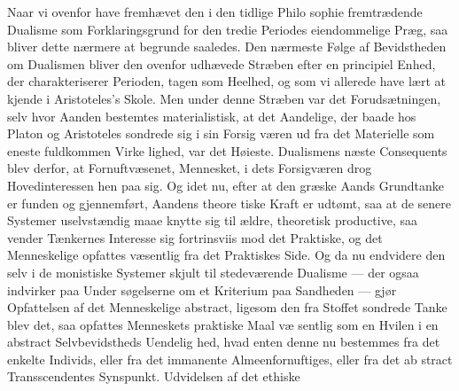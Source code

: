 \documentclass[12pt,a4paper]{book}
\begin{document}
Naar vi ovenfor have fremhævet den i den tidlige Philo\-%
sophie fremtrædende Dualisme som Forklaringsgrund for den
tredie Periodes eiendommelige Præg, saa bliver dette nærmere
at begrunde saaledes. Den nærmeste Følge af Bevidstheden
om Dualismen bliver den ovenfor udhævede Stræben efter en
principiel Enhed, der charakteriserer Perioden, tagen som
Heelhed, og som vi allerede have lært at kjende i Aristoteles's
Skole. Men under denne Stræben var det Forudsætningen,
selv hvor Aanden bestemtes materialistisk, at det Aandelige,
der baade hos Platon og Aristoteles sondrede sig i sin Forsig\-%
væren ud fra det Materielle som eneste fuldkommen Virke\-%
lighed, var det Høieste. Dualismens næste Consequents blev
derfor, at Fornuftvæsenet, Mennesket, i dets Forsigværen drog
Hovedinteressen hen paa sig. Og idet nu, efter at den græske
Aands Grundtanke er funden og gjennemført, Aandens theore\-%
tiske Kraft er udtømt, saa at de senere Systemer uselvstændig
maae knytte sig til ældre, theoretisk productive, saa vender
Tænkernes Interesse sig fortrinsviis mod det Praktiske, og det
Menneskelige opfattes væsentlig fra det Praktiskes Side. Og
da nu endvidere den selv i de monistiske Systemer skjult til\-%
stedeværende Dualisme --- der ogsaa indvirker paa Under\-%
søgelserne om et Kriterium paa Sandheden --- gjør Opfattelsen
af det Menneskelige abstract, ligesom den fra Stoffet sondrede
Tanke blev det, saa opfattes Menneskets praktiske Maal væ\-%
sentlig som en Hvilen i en abstract Selvbevidstheds Uendelig\-%
hed, hvad enten denne nu bestemmes fra det enkelte Individs,
eller fra det immanente Almeenfornuftiges, eller fra det ab\-%
stract Transscendentes Synspunkt. Udvidelsen af det ethiske
\end{document}
